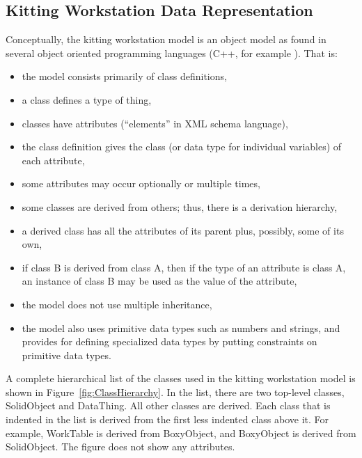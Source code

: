 \subsection{Kitting Workstation Data Representation}
\label{subsect:dataRep}
Conceptually, the kitting workstation model is an object model as found in
several object oriented programming languages (C++, for example
\cite{Stroustrup.2000}).  That is:
\begin{itemize}
\item the model consists primarily of class definitions,
\item a class defines a type of thing,
\item classes have attributes (``elements'' in XML schema language),
\item the class definition gives the class (or data type for individual variables) of each attribute,
\item some attributes may occur optionally or multiple times,
\item some classes are derived from others; thus, there is a derivation
 hierarchy,
\item a derived class has all the attributes of its parent plus, possibly,
  some of its own,
\item if class B is derived from class A, then if the type of an attribute
  is class A, an instance of class B may be used as the value of the attribute,
\item the model does not use multiple inheritance,
\item the model also uses primitive data types such as numbers and strings,
  and provides for defining specialized data types by putting constraints
  on primitive data types.
\end{itemize}

A complete hierarchical list of the classes used in the kitting workstation
model is shown in Figure~\ref{fig:ClassHierarchy}. In the list, there are two
top-level classes, SolidObject and DataThing. All other classes are
derived. Each class that is indented in the list is derived from the first
less indented class above it. For example, WorkTable is derived from
BoxyObject, and BoxyObject is derived from SolidObject. The figure does not
show any attributes.

